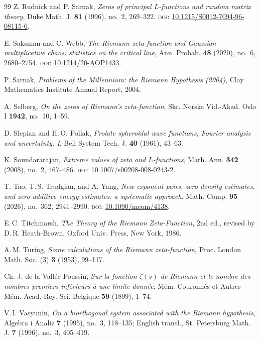 \documentclass[11pt]{amsart}
\theoremstyle{definition}
\theoremstyle{remark}
\begin{document}
\begin{thebibliography}{99}
Z. Rudnick and P. Sarnak,
\textit{Zeros of principal $L$-functions and random matrix theory},
Duke Math. J. \textbf{81} (1996), no.~2, 269--322.
\textsc{doi:} \href{https://doi.org/10.1215/S0012-7094-96-08115-6}{10.1215/S0012-7094-96-08115-6}.

E. Saksman and C. Webb,
\textit{The Riemann zeta function and Gaussian multiplicative chaos: statistics on the critical line},
Ann. Probab. \textbf{48} (2020), no.~6, 2680--2754.
\textsc{doi:} \href{https://doi.org/10.1214/20-AOP1433}{10.1214/20-AOP1433}.

P. Sarnak,
\textit{Problems of the Millennium: the Riemann Hypothesis (2004)},
Clay Mathematics Institute Annual Report, 2004.

A. Selberg,
\textit{On the zeros of Riemann's zeta-function},
Skr. Norske Vid.-Akad. Oslo I \textbf{1942}, no.~10, 1--59.

D. Slepian and H.\,O. Pollak,
\textit{Prolate spheroidal wave functions, Fourier analysis and uncertainty. I},
Bell System Tech. J. \textbf{40} (1961), 43--63.

K. Soundararajan,
\textit{Extreme values of zeta and $L$-functions},
Math. Ann. \textbf{342} (2008), no.~2, 467--486.
\textsc{doi:} \href{https://doi.org/10.1007/s00208-008-0243-2}{10.1007/s00208-008-0243-2}.

T. Tao, T.\,S. Trudgian, and A. Yang,
\textit{New exponent pairs, zero density estimates, and zero additive energy estimates: a systematic approach},
Math. Comp. \textbf{95} (2026), no.~362, 2941--2990.
\textsc{doi:} \href{https://doi.org/10.1090/mcom/4138}{10.1090/mcom/4138}.

E.\,C. Titchmarsh,
\textit{The Theory of the Riemann Zeta-Function},
2nd ed., revised by D.\,R. Heath-Brown,
Oxford Univ. Press, New York, 1986.

A.\,M. Turing,
\textit{Some calculations of the Riemann zeta-function},
Proc. London Math. Soc. (3) \textbf{3} (1953), 99--117.

Ch.-J. de la Vall\'ee Poussin,
\textit{Sur la fonction $\zeta(s)$ de Riemann et le nombre des nombres premiers inf\'erieurs \`a une limite donn\'ee},
M\'em. Couronn\'es et Autres M\'em. Acad. Roy. Sci. Belgique \textbf{59} (1899), 1--74.

V.\,I. Vasyunin,
\textit{On a biorthogonal system associated with the Riemann hypothesis},
Algebra i Analiz \textbf{7} (1995), no.~3, 118--135; English transl., St. Petersburg Math. J. \textbf{7} (1996), no.~3, 405--419.


\end{thebibliography}
\end{document}
